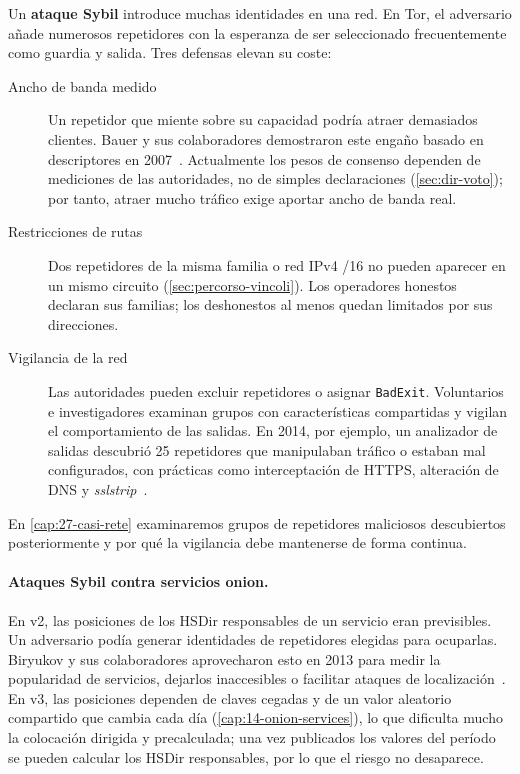 Un \textbf{ataque Sybil} introduce muchas identidades en una red. En Tor, el adversario añade numerosos repetidores con la esperanza de ser seleccionado frecuentemente como guardia y salida. Tres defensas elevan su coste:
\begin{description}
  \item[Ancho de banda medido] Un repetidor que miente sobre su capacidad podría atraer demasiados clientes. Bauer y sus colaboradores demostraron este engaño basado en descriptores en 2007~\cite{bauer2007lowresource}. Actualmente los pesos de consenso dependen de mediciones de las autoridades, no de simples declaraciones (\cref{sec:dir-voto}); por tanto, atraer mucho tráfico exige aportar ancho de banda real.
  \item[Restricciones de rutas] Dos repetidores de la misma familia o red IPv4 /16 no pueden aparecer en un mismo circuito (\cref{sec:percorso-vincoli}). Los operadores honestos declaran sus familias; los deshonestos al menos quedan limitados por sus direcciones.
  \item[Vigilancia de la red] Las autoridades pueden excluir repetidores o asignar \texttt{BadExit}. Voluntarios e investigadores examinan grupos con características compartidas y vigilan el comportamiento de las salidas. En 2014, por ejemplo, un analizador de salidas descubrió 25 repetidores que manipulaban tráfico o estaban mal configurados, con prácticas como interceptación de HTTPS, alteración de DNS y \emph{sslstrip}~\cite{winter2014spoiled}.
\end{description}

En \cref{cap:27-casi-rete} examinaremos grupos de repetidores maliciosos descubiertos posteriormente y por qué la vigilancia debe mantenerse de forma continua.

\paragraph{Ataques Sybil contra servicios onion.} En v2, las posiciones de los HSDir responsables de un servicio eran previsibles. Un adversario podía generar identidades de repetidores elegidas para ocuparlas. Biryukov y sus colaboradores aprovecharon esto en 2013 para medir la popularidad de servicios, dejarlos inaccesibles o facilitar ataques de localización~\cite{biryukov2013trawling}. En v3, las posiciones dependen de claves cegadas y de un valor aleatorio compartido que cambia cada día (\cref{cap:14-onion-services}), lo que dificulta mucho la colocación dirigida y precalculada; una vez publicados los valores del período se pueden calcular los HSDir responsables, por lo que el riesgo no desaparece.

